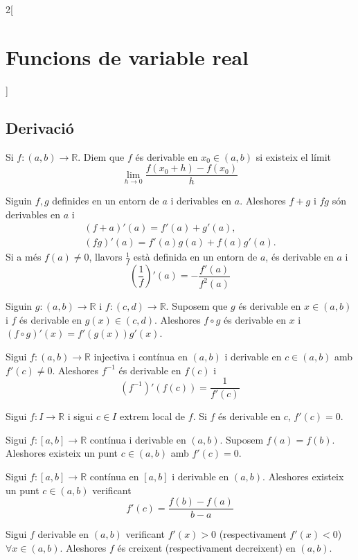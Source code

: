 \documentclass[class=article,10pt,crop=false]{standalone}
\begin{document}
\begin{multicols}{2}[\section{Funcions de variable real}]
\subsection{Derivació}
\begin{definition}
Si $f:(a,b)\rightarrow\mathbb{R}$. Diem que $f$ és derivable en $x_0\in(a,b)$ si existeix el límit $$\lim_{h\to 0}\frac{f(x_0+h)-f(x_0)}{h}$$
\end{definition}
\begin{prop}
Siguin $f,g$ definides en un entorn de $a$ i derivables en $a$. Aleshores $f+g$ i $fg$ són derivables en $a$ i \begin{gather*}
    (f+a)'(a)=f'(a)+g'(a),\\
    (fg)'(a)=f'(a)g(a)+f(a)g'(a).
\end{gather*} Si a més $f(a)\ne 0$, llavors $\frac{1}{f}$ està definida en un entorn de $a$, és derivable en $a$ i $$\left(\frac{1}{f}\right)'(a)=-\frac{f'(a)}{f^2(a)}$$
\end{prop}
\begin{prop}
Siguin $g:(a,b)\rightarrow\mathbb{R}$ i $f:(c,d)\rightarrow\mathbb{R}$. Suposem que $g$ és derivable en $x\in(a,b)$ i $f$ és derivable en $g(x)\in(c,d)$. Aleshores $f\circ g$ és derivable en $x$ i $(f\circ g)'(x)=f'(g(x))g'(x)$.
\end{prop}
\begin{prop}
Sigui $f:(a,b)\rightarrow\mathbb{R}$ injectiva i contínua en $(a,b)$ i derivable en $c\in(a,b)$ amb $f'(c)\ne 0$. Aleshores $f^{-1}$ és derivable en $f(c)$ i $$(f^{-1})'(f(c))=\frac{1}{f'(c)}$$
\end{prop}
\begin{prop}
Sigui $f:I\rightarrow\mathbb{R}$ i sigui $c\in I$ extrem local de $f$. Si $f$ és derivable en $c$, $f'(c)=0$.
\end{prop}
\begin{theorem}
Sigui $f:[a,b]\rightarrow\mathbb{R}$ contínua i derivable en $(a,b)$. Suposem $f(a)=f(b)$. Aleshores existeix un punt $c\in (a,b)$ amb $f'(c)=0$.
\end{theorem}
\begin{theorem}
Sigui $f:[a,b]\rightarrow\mathbb{R}$ contínua en $[a,b]$ i derivable en $(a,b)$. Aleshores existeix un punt $c\in (a,b)$ verificant $$f'(c)=\frac{f(b)-f(a)}{b-a}$$
\end{theorem}
\begin{corollary}
Sigui $f$ derivable en $(a,b)$ verificant $f'(x)>0$ (respectivament $f'(x)<0$) $\forall x\in(a,b)$. Aleshores $f$ és creixent (respectivament decreixent) en $(a,b)$.

\end{corollary}
\end{multicols}
\end{document}
